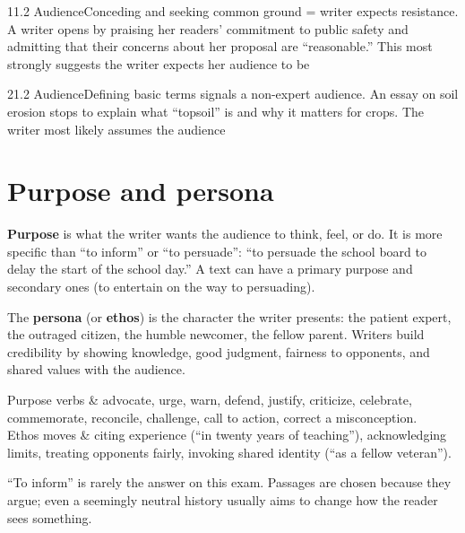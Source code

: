 \documentclass[11pt]{article}
\begin{document}
\begin{q}{1}{1.2 Audience}{Conceding and seeking common ground = writer expects resistance.}
A writer opens by praising her readers' commitment to public safety and admitting that their concerns about her proposal are ``reasonable.'' This most strongly suggests the writer expects her audience to be
\end{q}

\begin{q}{2}{1.2 Audience}{Defining basic terms signals a non-expert audience.}
An essay on soil erosion stops to explain what ``topsoil'' is and why it matters for crops. The writer most likely assumes the audience
\end{q}

\section{Purpose and persona}

\textbf{Purpose} is what the writer wants the audience to think, feel, or do. It is more specific than ``to inform'' or ``to persuade'': ``to persuade the school board to delay the start of the school day.'' A text can have a primary purpose and secondary ones (to entertain on the way to persuading).

The \textbf{persona} (or \textbf{ethos}) is the character the writer presents: the patient expert, the outraged citizen, the humble newcomer, the fellow parent. Writers build credibility by showing knowledge, good judgment, fairness to opponents, and shared values with the audience.

\begin{terms}
Purpose verbs & advocate, urge, warn, defend, justify, criticize, celebrate, commemorate, reconcile, challenge, call to action, correct a misconception. \\
Ethos moves & citing experience (``in twenty years of teaching''), acknowledging limits, treating opponents fairly, invoking shared identity (``as a fellow veteran''). \\
\end{terms}

\begin{trap}
``To inform'' is rarely the answer on this exam. Passages are chosen because they argue; even a seemingly neutral history usually aims to change how the reader sees something.
\end{trap}
\end{document}
